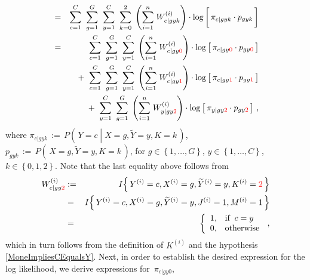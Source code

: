 \begin{enumerate}
\begin{eqnarray*}
&=&
	\overset{C}{\underset{c=1}{\sum}}\;\;
	\overset{G}{\underset{g=1}{\sum}}\;\;
	\overset{C}{\underset{y=1}{\sum}}\;\;
	\overset{2}{\underset{k=0}{\sum}}\;
	\left(\overset{n}{\underset{i=1}{\sum}}\;W^{(i)}_{c \vert gyk}\right)
	\cdot
	\log\left[\,
		\pi_{c \vert gyk} \overset{{\color{white}\vert}}{\cdot} p_{gyk}
	\,\right]
\\
&=&
	{\color{white}+} \;\;
	\overset{C}{\underset{c=1}{\sum}}\;\;
	\overset{G}{\underset{g=1}{\sum}}\;\;
	\overset{C}{\underset{y=1}{\sum}}\;
	\left(\overset{n}{\underset{i=1}{\sum}}\;W^{(i)}_{c \vert gy{\color{red}0}}\right)
	\cdot
	\log\left[\,
		\pi_{c \vert gy\color{red}0} \cdot p_{gy\color{red}0}
	\,\right]
\\
&&
	+ \;\;
	\overset{C}{\underset{c=1}{\sum}}\;\;
	\overset{G}{\underset{g=1}{\sum}}\;\;
	\overset{C}{\underset{y=1}{\sum}}\;
	\left(\overset{n}{\underset{i=1}{\sum}}\;W^{(i)}_{c \vert gy{\color{red}1}}\right)
	\cdot
	\log\left[\,
		\pi_{c \vert gy\color{red}1} \cdot p_{gy\color{red}1}
	\,\right]
\\
&&
	+ \;\;
	\overset{C}{\underset{y=1}{\sum}}\;\;
	\overset{G}{\underset{g=1}{\sum}}\;
	\left(\overset{n}{\underset{i=1}{\sum}}\;W^{(i)}_{y \vert gy{\color{red}2}}\right)
	\cdot
	\log\left[\,
		\pi_{y \vert gy\color{red}2} \cdot p_{gy\color{red}2}
	\,\right]\,,
\end{eqnarray*}
where
\;$\pi_{c \vert gyk} \, := \, P\!\left(\,Y=c\;\left\vert\;X=g,\widetilde{Y}=y,K=k\right.\,\right)$,
\;$p_{gyk} \, := \, P\!\left(\,X=g,\widetilde{Y}=y,K=k\,\right)$,
\;for
\;$g \in \left\{1,\ldots,G\right\}$,
\;$y \in \left\{1,\ldots,C\right\}$,
\,$k \in \left\{0,1,2\right\}$.
\;Note that the last equality above follows from
\begin{eqnarray*}
W^{(i)}_{c \vert gy{\color{red}2}}
&:=&
	I\!\left\{\,Y^{(i)}=c,X^{(i)}=g,\widetilde{Y}^{(i)}=y,K^{(i)}={\color{red}2}\,\right\}
\\
&=&
	I\!\left\{\,Y^{(i)}=c,X^{(i)}=g,\widetilde{Y}^{(i)}=y,J^{(i)}=1,M^{(i)}=1\,\right\}
\\
&=&
	\left\{\begin{array}{cl}
		1, & \textnormal{if}\;\; c = y
		\\
		0, & \textnormal{otherwise}
	\end{array}\right.\,,
\end{eqnarray*}
which in turn follows from the definition of $K^{(i)}$ and
the hypothesis \eqref{MoneImpliesCEqualsY}.
Next, in order to establish the desired expression for the log likelihood,
we derive expressions for
\,$\pi_{c \vert gy0}$,

\end{enumerate}
